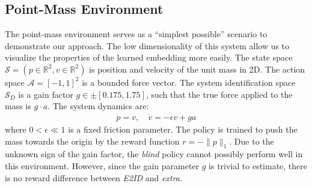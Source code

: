 \documentclass{article}
\newcommand{\R}{\mathbb{R}}
\newcommand{\TODO}[1]{\textcolor{red}{\textbf{TODO: #1}}}
\newcommand{\cA}{\mathcal{A}}
\newcommand{\cS}{\mathcal{S}}
\newcommand{\blind}{\emph{blind}}
\newcommand{\plain}{\emph{plain}}
\newcommand{\extra}{\emph{extra}}
\newcommand{\embed}{\emph{E2ID}}
\begin{document}
\subsection{Point-Mass Environment}
\label{pointmass}
The point-mass environment serves as a ``simplest possible'' scenario to demonstrate our approach.
The low dimensionality of this system allow us to visualize the properties of the learned embedding more easily.
The state space $\cS = (p \in \R^2, v \in \R^2)$ is position and velocity of the unit mass in 2D.
The action space $\cA = [-1, 1]^2$ is a bounded force vector.
The system identification space $\cS_D$ is a gain factor $g \in \pm[0.175, 1.75]$,
such that the true force applied to the mass is $g \cdot a$.
The system dynamics are:
\begin{equation}\begin{split}
\dot p = v, \quad \dot v = -\epsilon v + ga
\end{split}\end{equation}
where $0 < \epsilon \ll 1$ is a fixed friction parameter.
The policy is trained to push the mass towards the origin
by the reward function $r = -\|p\|_1$.
Due to the unknown sign of the gain factor, the \blind{} policy cannot possibly perform well in this environment.
However, since the gain parameter $g$ is trivial to estimate,
there is no reward difference between \embed{} and \extra{}.

\end{document}
